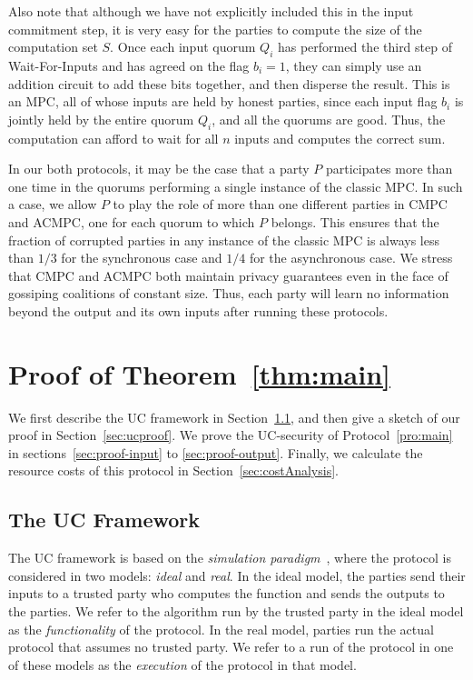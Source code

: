 \documentclass[11pt,letter]{article}
\newcommand{\alg}[1]{\mbox{\textsf{#1}}}
\theoremstyle{mytheoremstyle}
\begin{document}
Also note that although we have not explicitly included this in the input commitment step, it is very easy for the parties to compute the size of the computation set $S$. Once each input quorum $Q_i$ has performed the third step of \alg{Wait-For-Inputs} and has agreed on the flag $b_i = 1$, they can simply use an addition circuit to add these bits together, and then disperse the result. This is an MPC, all of whose inputs are held by honest parties, since each input flag $b_i$ is jointly held by the entire quorum $Q_i$, and all the quorums are good. Thus, the computation can afford to wait for all $n$ inputs and computes the correct sum.

In our both protocols, it may be the case that a party $P$ participates more than one time in the quorums performing a single instance of the classic MPC. In such a case, we allow $P$ to play the role of more than one different parties in \alg{CMPC} and \alg{ACMPC}, one for each quorum to which $P$ belongs. This ensures that the fraction of corrupted parties in any instance of the classic MPC is always less than $1/3$ for the synchronous case and $1/4$ for the asynchronous case. We stress that \alg{CMPC} and \alg{ACMPC} both maintain privacy guarantees even in the face of gossiping coalitions of constant size. Thus, each party will learn no information beyond the output and its own inputs after running these protocols.

\section{Proof of Theorem~\ref{thm:main}} \label{sec:mainproofs}
We first describe the UC framework in Section~\ref{sec:ucframework}, and then give a sketch of our proof in Section~\ref{sec:ucproof}. We prove the UC-security of Protocol~\ref{pro:main} in sections~\ref{sec:proof-input} to \ref{sec:proof-output}. Finally, we calculate the resource costs of this protocol in Section~\ref{sec:costAnalysis}.

\subsection{The UC Framework} \label{sec:ucframework}
The UC framework is based on the \emph{simulation paradigm}~\cite{Goldreich:2000:FCB:519078}, where the protocol is considered in two models: \emph{ideal} and \emph{real}. In the ideal model, the parties send their inputs to a trusted party who computes the function and sends the outputs to the parties. We refer to the algorithm run by the trusted party in the ideal model as the \emph{functionality} of the protocol. In the real model, parties run the actual protocol that assumes no trusted party. We refer to a run of the protocol in one of these models as the \emph{execution} of the protocol in that model.
\end{document}

